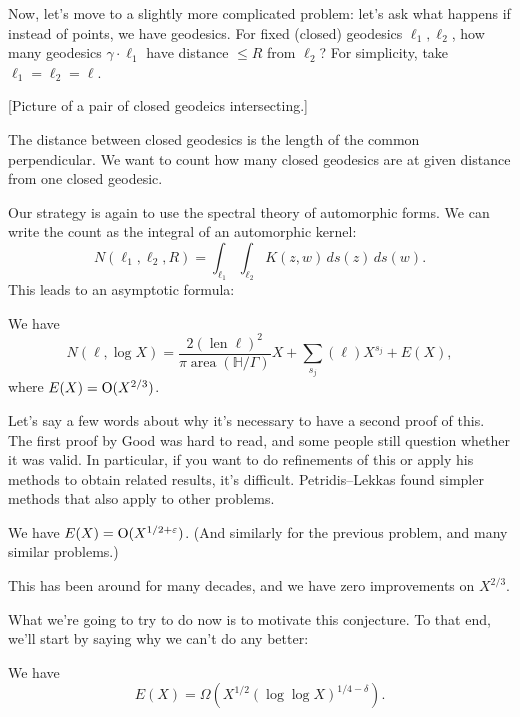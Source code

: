 \documentclass[reqno]{amsart} 
\begin{document}
Now, let's move to a slightly more complicated problem: let's ask what happens if instead of points, we have geodesics.  For fixed (closed) geodesics $\ell_1, \ell_2$, how many geodesics $\gamma \cdot \ell_1$ have distance $\leq R$ from $\ell_2$?  For simplicity, take $\ell_1 = \ell_2 = \ell$.

[Picture of a pair of closed geodeics intersecting.]

The distance between closed geodesics is the length of the common perpendicular.  We want to count how many closed geodesics are at given distance from one closed geodesic.

Our strategy is again to use the spectral theory of automorphic forms.  We can write the count as the integral of an automorphic kernel:
\begin{equation*}
  N(\ell_1, \ell_2, R) = \int_{\ell_1} \int_{\ell_2}
  K(z, w)
  \, d s(z)
  \, d s(w).
\end{equation*}
This leads to an asymptotic formula:
\begin{theorem}
  We have
  \begin{equation*}
    N(\ell, \log X)
    = \frac{2(\operatorname{len} \ell)^2}{\pi \operatorname{area}(\mathbb{H} / \Gamma)} X
    + \sum_{s_j}(\ell) X^{s_j} + E(X),
  \end{equation*}
  where $E(X) = \operatorname{O}(X^{2/3})$.
\end{theorem}

Let's say a few words about why it's necessary to have a second proof of this.  The first proof by Good was hard to read, and some people still question whether it was valid.  In particular, if you want to do refinements of this or apply his methods to obtain related results, it's difficult.  Petridis--Lekkas found simpler methods that also apply to other problems.

\begin{conjecture}
  We have $E(X) = \operatorname{O}(X^{1/2 + \varepsilon})$.  (And similarly for the previous problem, and many similar problems.)
\end{conjecture}

This has been around for many decades, and we have zero improvements on $X^{2/3}$.

What we're going to try to do now is to motivate this conjecture.  To that end, we'll start by saying why we can't do any better:
\begin{theorem}[V.\ 2024]
  We  have
  \begin{equation*}
    E(X) = \Omega \left( X^{1/2}(\log \log X)^{1/4 - \delta} \right).
  \end{equation*}
\end{theorem}
\end{document}
